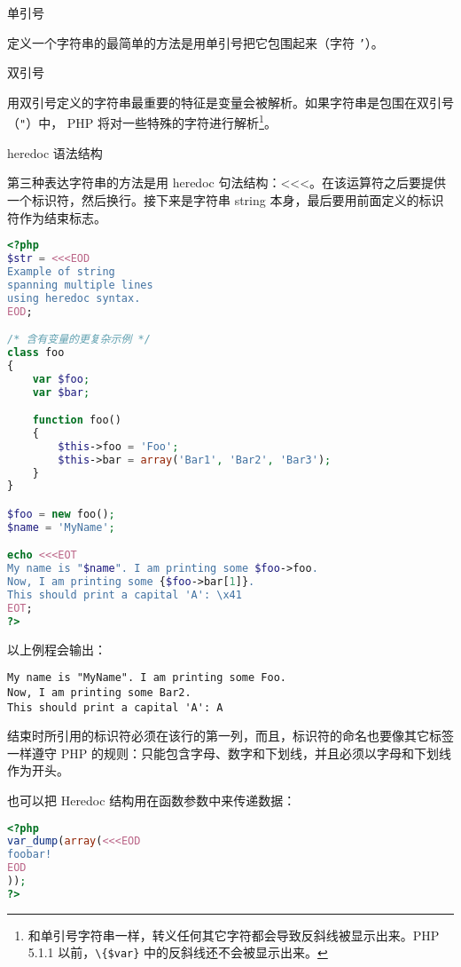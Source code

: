 \begin{compactitem}
\item 单引号

定义一个字符串的最简单的方法是用单引号把它包围起来（字符 \texttt{'}）。


\item 双引号

用双引号定义的字符串最重要的特征是变量会被解析。如果字符串是包围在双引号（\texttt{"}）中， PHP 将对一些特殊的字符进行解析\footnote{和单引号字符串一样，转义任何其它字符都会导致反斜线被显示出来。PHP 5.1.1 以前，\texttt{\textbackslash\{\$var\}} 中的反斜线还不会被显示出来。}。








\item heredoc 语法结构

第三种表达字符串的方法是用 heredoc 句法结构：<\/<\/<。在该运算符之后要提供一个标识符，然后换行。接下来是字符串 string 本身，最后要用前面定义的标识符作为结束标志。

\begin{lstlisting}[language=PHP]
<?php
$str = <<<EOD
Example of string
spanning multiple lines
using heredoc syntax.
EOD;

/* 含有变量的更复杂示例 */
class foo
{
    var $foo;
    var $bar;

    function foo()
    {
        $this->foo = 'Foo';
        $this->bar = array('Bar1', 'Bar2', 'Bar3');
    }
}

$foo = new foo();
$name = 'MyName';

echo <<<EOT
My name is "$name". I am printing some $foo->foo.
Now, I am printing some {$foo->bar[1]}.
This should print a capital 'A': \x41
EOT;
?>
\end{lstlisting}

以上例程会输出：

\begin{verbatim}
My name is "MyName". I am printing some Foo.
Now, I am printing some Bar2.
This should print a capital 'A': A
\end{verbatim}

结束时所引用的标识符必须在该行的第一列，而且，标识符的命名也要像其它标签一样遵守 PHP 的规则：只能包含字母、数字和下划线，并且必须以字母和下划线作为开头。

也可以把 Heredoc 结构用在函数参数中来传递数据：

\begin{lstlisting}[language=PHP]
<?php
var_dump(array(<<<EOD
foobar!
EOD
));
?>
\end{lstlisting}


\end{compactitem}
